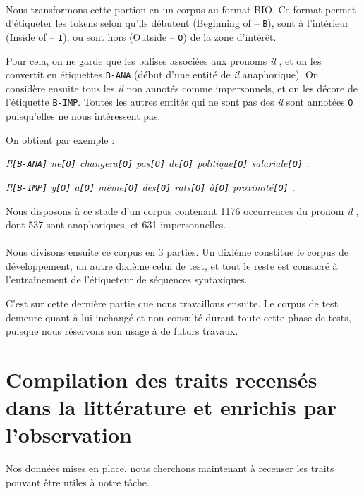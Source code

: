\documentclass[a4paper,12pt]{article}
\begin{document}
\paragraph{}
Nous transformons cette portion en un corpus au format BIO. Ce format permet d'étiqueter les tokens selon qu'ils débutent (Beginning of -- \verb!B!), sont à l'intérieur (Inside of -- \verb!I!), ou sont hors (Outside -- \verb!O!) de la zone d'intérêt.

Pour cela, on ne garde que les balises associées aux pronoms \og \textit{il} \fg{}, et on les convertit en étiquettes \verb!B-ANA! (début d'une entité de \og \textit{il} \fg{} anaphorique). On considère ensuite tous les \og \textit{il} \fg{} non annotés comme impersonnels, et on les décore de l'étiquette \verb!B-IMP!. Toutes les autres entités qui ne sont pas des \og \textit{il} \fg{} sont annotées \verb!O! puisqu'elles ne nous intéressent pas.
\label{annotation-imp}

On obtient par exemple :

\textit{Il\verb![B-ANA]! ne\verb![O]! changera\verb![O]! pas\verb![O]! de\verb![O]! politique\verb![O]! salariale\verb![O]! .}

\textit{Il\verb![B-IMP]! y\verb![O]! a\verb![O]! même\verb![O]! des\verb![O]! rats\verb![O]! à\verb![O]! proximité\verb![O]! .}

Nous disposons à ce stade d'un corpus contenant 1176 occurrences du pronom \og \textit{il} \fg{}, dont 537 sont anaphoriques, et 631 impersonnelles.

\paragraph{}
Nous divisons ensuite ce corpus en 3 parties. Un dixième constitue le corpus de développement, un autre dixième celui de test, et tout le reste est consacré à l'entraînement de l'étiqueteur de séquences syntaxiques.


C'est sur cette dernière partie que nous travaillons ensuite.
Le corpus de test demeure quant-à lui inchangé et non consulté durant toute cette phase de tests, puisque nous réservons son usage à de futurs travaux.

\section{Compilation des traits recensés dans la littérature et enrichis par l'observation}
\label{approche-traits}

Nos données mises en place, nous cherchons maintenant à recenser les traits pouvant être utiles à notre tâche.
\end{document}

